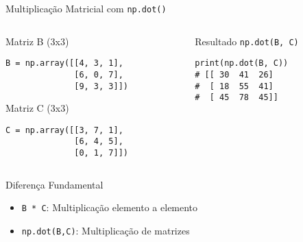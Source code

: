 \begin{frame}[fragile]{Multiplicação Matricial com \texttt{np.dot()}}

    \begin{columns}[T]
        \begin{column}{0.4\textwidth}
            \begin{block}{Matriz B (3x3)}
                \begin{verbatim}
B = np.array([[4, 3, 1],
              [6, 0, 7],
              [9, 3, 3]])
\end{verbatim}
            \end{block}

            \begin{block}{Matriz C (3x3)}
                \begin{verbatim}
C = np.array([[3, 7, 1],
              [6, 4, 5],
              [0, 1, 7]])
\end{verbatim}
            \end{block}
        \end{column}

        \begin{column}{0.6\textwidth}
            \begin{exampleblock}{Resultado \texttt{np.dot(B, C)}}
                \begin{verbatim}
print(np.dot(B, C))
# [[ 30  41  26]
#  [ 18  55  41]
#  [ 45  78  45]]
\end{verbatim}
            \end{exampleblock}
        \end{column}
    \end{columns}




    \begin{alertblock}{Diferença Fundamental}
        \begin{itemize}
            \item \texttt{B * C}: Multiplicação elemento a elemento
            \item \texttt{np.dot(B,C)}: Multiplicação de matrizes
        \end{itemize}
    \end{alertblock}
\end{frame}

